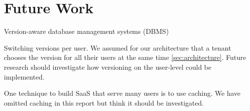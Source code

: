 \section{Future Work}
\label{sec:futurework}

Version-aware database management systems (DBMS)

Switching versions per user. We assumed for our architecture that a tenant chooses the version for all their users at the same time \ref{sec:architecture}. Future research should investigate how versioning on the user-level could be implemented.

One technique to build SaaS that serve many users is to use caching. We have omitted caching in this report but think it should be investigated.